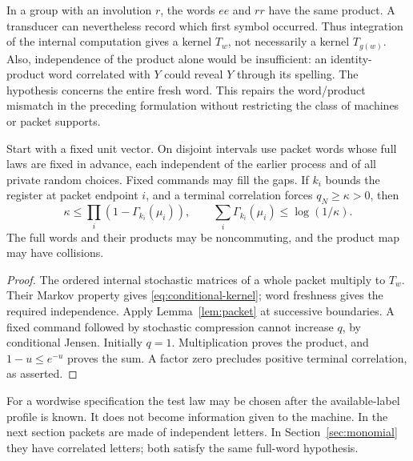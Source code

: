 \begin{remark}\label{rem:collision}
In a group with an involution $r$, the words $ee$ and $rr$ have the same
product. A transducer can nevertheless record which first symbol occurred.
Thus integration of the internal computation gives a kernel $T_w$, not
necessarily a kernel $T_{g(w)}$. Also, independence of the product alone
would be insufficient: an identity-product word correlated with $Y$
could reveal $Y$ through its spelling. The hypothesis concerns the entire
fresh word. This repairs the word/product mismatch in the preceding
formulation without restricting the class of machines or packet supports.
\end{remark}

\begin{theorem}\label{thm:packet-budget}
Start with a fixed unit vector. On disjoint intervals use packet words
whose full laws are fixed in advance, each independent of the earlier
process and of all private random choices. Fixed commands may fill the
gaps. If $k_i$ bounds the register at packet endpoint $i$, and a terminal
correlation forces $q_N\ge\kappa>0$, then
\begin{equation}\label{eq:budget}
 \kappa\le\prod_i(1-\Gamma_{k_i}(\mu_i)),\qquad
 \sum_i\Gamma_{k_i}(\mu_i)\le\log(1/\kappa).
\end{equation}
The full words and their products may be noncommuting, and the product
map may have collisions.
\end{theorem}
\begin{proof}
The ordered internal stochastic matrices of a whole packet multiply to
$T_w$. Their Markov property gives \eqref{eq:conditional-kernel}; word
freshness gives the required independence. Apply Lemma~\ref{lem:packet}
at successive boundaries. A fixed command followed by stochastic
compression cannot increase $q$, by conditional Jensen. Initially $q=1$.
Multiplication proves the product, and $1-u\le e^{-u}$ proves the sum.
A factor zero precludes positive terminal correlation, as asserted.
\end{proof}

For a wordwise specification the test law may be chosen after the
available-label profile is known. It does not become information given
to the machine. In the next section packets are made of independent
letters. In Section~\ref{sec:monomial} they have correlated letters;
both satisfy the same full-word hypothesis.
